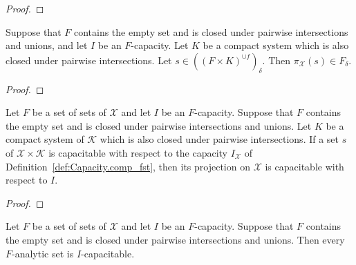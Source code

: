 \begin{proof}\leanok

\end{proof}


\begin{lemma}\label{lem:mem_countableInfClosure_fst}
  \leanok
Suppose that $F$ contains the empty set and is closed under pairwise intersections and unions, and let $I$ be an $F$-capacity.
Let $K$ be a compact system which is also closed under pairwise intersections.
Let $s \in ((F \times K)^{\cup f})_\delta$.
Then $\pi_{\mathcal{X}}(s) \in F_\delta$.
\end{lemma}

\begin{proof}\leanok

\end{proof}


\begin{lemma}\label{lem:IsCapacitable.fst}
  \leanok
Let $F$ be a set of sets of $\mathcal{X}$ and let $I$ be an $F$-capacity.
Suppose that $F$ contains the empty set and is closed under pairwise intersections and unions.
Let $K$ be a compact system of $\mathcal{K}$ which is also closed under pairwise intersections.
If a set $s$ of $\mathcal{X} \times \mathcal{K}$ is capacitable with respect to the capacity $I_{\mathcal{X}}$ of Definition~\ref{def:Capacity.comp_fst}, then its projection on $\mathcal{X}$ is capacitable with respect to $I$.
\end{lemma}

\begin{proof}\leanok

\end{proof}


\begin{theorem}\label{thm:IsPavingAnalytic.isCapacitable}
  \leanok
Let $F$ be a set of sets of $\mathcal{X}$ and let $I$ be an $F$-capacity.
Suppose that $F$ contains the empty set and is closed under pairwise intersections and unions.
Then every $F$-analytic set is $I$-capacitable.
\end{theorem}

